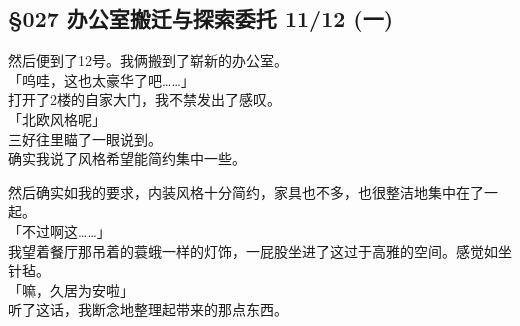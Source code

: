 \subsection{§027 办公室搬迁与探索委托 11/12 (一)}

然后便到了12号。我俩搬到了崭新的办公室。\\

「呜哇，这也太豪华了吧……」\\

打开了2楼的自家大门，我不禁发出了感叹。\\

「北欧风格呢」\\

三好往里瞄了一眼说到。\\

确实我说了风格希望能简约集中一些。

然后确实如我的要求，内装风格十分简约，家具也不多，也很整洁地集中在了一起。\\

「不过啊这……」\\

我望着餐厅那吊着的蓑蛾一样的灯饰，一屁股坐进了这过于高雅的空间。感觉如坐针毡。\\

「嘛，久居为安啦」\\

听了这话，我断念地整理起带来的那点东西。\\

